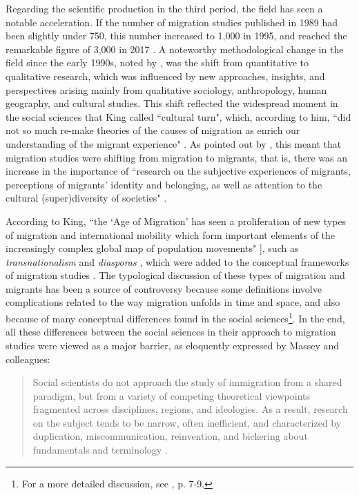 Regarding the scientific production in the third period, the field has seen a notable acceleration. If the number of migration studies published in 1989 had been slightly under 750, this number increased to 1,000 in 1995, and reached the remarkable figure of 3,000 in 2017 \citep{levy_between_2020, scholten_introduction_2022}. A noteworthy methodological change in the field since the early 1990s, noted by \cite{king_theories_2012}, was the shift from quantitative to qualitative research, which was influenced by new approaches, insights, and perspectives arising mainly from qualitative sociology, anthropology, human geography, and cultural studies. This shift reflected the widespread moment in the social sciences that King called ``cultural turn", which, according to him, ``did not so much re-make theories of the causes of migration as enrich our understanding of the migrant experience" \citep[p. 25]{king_theories_2012}. As pointed out by \cite{scholten_introduction_2022}, this meant that migration studies were shifting from migration to migrants, that is, there was an increase in the importance of ``research on the subjective experiences of migrants, perceptions of migrants’ identity and belonging, as well as attention to the cultural (super)diversity of societies" \citep[p. 21]{scholten_introduction_2022}.

According to King, ``the `Age of Migration' has seen a proliferation of new types of migration and international mobility which form important elements of the increasingly complex global map of population movements" \citep[p. 9]{king_theories_2012}], such as \textit{transnationalism} \citep{schiller_transnationalism_1992} and \textit{diasporas} \citep{cohen_global_2008}, which were added to the conceptual frameworks of migration studies \citep{king_theories_2012}. The typological discussion of these types of migration and migrants has been a source of controversy because some definitions involve complications related to the way migration unfolds in time and space, and also because of many conceptual differences found in the social sciences\footnote{For a more detailed discussion, see \cite{king_theories_2012}, p. 7-9.}. In the end, all these differences between the social sciences in their approach to migration studies were viewed as a major barrier, as eloquently expressed by Massey and colleagues:

\begin{quote}
Social scientists do not approach the study of immigration from a shared paradigm, but from a variety of competing theoretical viewpoints fragmented across disciplines, regions, and ideologies. As a result, research on the subject tends to be narrow, often inefficient, and characterized by duplication, miscommunication, reinvention, and bickering about fundamentals and terminology \citep[p. 700-701]{massey_evaluation_1994}.
\end{quote}

